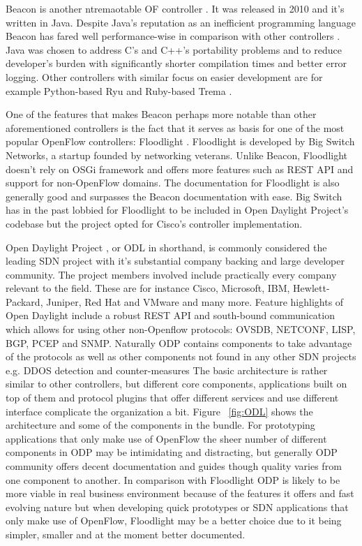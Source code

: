 	Beacon is another ntremaotable OF controller \cite{Beacon}. It was released in 2010 and it’s written in Java. Despite Java’s reputation as an inefficient programming language Beacon has fared well performance-wise in comparison with other controllers \cite{Erickson13}. Java was chosen to address C’s and C++’s portability problems and to reduce developer’s burden with significantly shorter compilation times and better error logging. Other controllers with similar focus on easier development are for example Python-based Ryu \cite{Ryu} and Ruby-based Trema \cite{Trema}.

One of the features that makes Beacon perhaps more notable than other aforementioned controllers is the fact that it serves as basis for one of the most popular OpenFlow controllers: Floodlight \cite{Floodlight}. Floodlight is developed by Big Switch Networks, a startup founded by networking veterans. Unlike Beacon, Floodlight doesn’t rely on OSGi framework and offers more features such as REST API and support for non-OpenFlow domains. The documentation for Floodlight is also generally good and surpasses the Beacon documentation with ease.
 Big Switch has in the past lobbied for Floodlight to be included in Open Daylight Project’s codebase \cite{BAN13} but the project opted for Cisco’s controller implementation. 

Open Daylight Project \cite{ODL}, or ODL in shorthand, is commonly considered the leading SDN project with it’s substantial company backing and large developer community. The project members involved include practically every company relevant to the field. These are for instance Cisco, Microsoft, IBM, Hewlett-Packard, Juniper, Red Hat and VMware and many more. Feature highlights of Open Daylight include  a robust REST API and south-bound communication which allows for using other non-Openflow protocols: OVSDB, NETCONF, LISP, BGP, PCEP and SNMP. Naturally ODP contains components to take advantage of the protocols as well as other components not found in any other SDN projects e.g. DDOS detection and counter-measures The basic architecture is rather similar to other controllers, but different core components, applications built on top of them and protocol plugins that offer different services and use different interface complicate the organization a bit. Figure ~\ref{fig:ODL} shows the architecture and some of the components in the bundle. For prototyping applications that only make use of OpenFlow the sheer number of different components in ODP may be intimidating and distracting, but generally ODP community offers decent documentation and guides though quality varies from one component to another. In comparison with Floodlight ODP is likely to be more viable in real business environment because of the features it offers and fast evolving nature but when developing quick prototypes or SDN applications that only make use of OpenFlow, Floodlight may be a better choice due to it being simpler, smaller and at the moment better documented.


